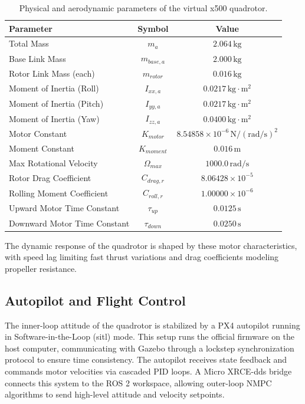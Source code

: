     \begin{table}[htbp]
        \centering
        \caption{Physical and aerodynamic parameters of the virtual x500 quadrotor.}
        \label{tab:uav_parameters}
        \begin{tabular}{lcc}
            \toprule
            \textbf{Parameter} & \textbf{Symbol} & \textbf{Value} \\
            \midrule
            Total Mass & $m_a$ & $2.064\,\text{kg}$ \\
            Base Link Mass & $m_{base,a}$ & $2.000\,\text{kg}$ \\
            Rotor Link Mass (each) & $m_{rotor}$ & $0.016\,\text{kg}$ \\
            Moment of Inertia (Roll) & $I_{xx,a}$ & $0.0217\,\text{kg}\cdot\text{m}^2$ \\
            Moment of Inertia (Pitch) & $I_{yy,a}$ & $0.0217\,\text{kg}\cdot\text{m}^2$ \\
            Moment of Inertia (Yaw) & $I_{zz,a}$ & $0.0400\,\text{kg}\cdot\text{m}^2$ \\
            Motor Constant & $K_{motor}$ & $8.54858 \times 10^{-6}\,\text{N}/(\text{rad/s})^2$ \\
            Moment Constant & $K_{moment}$ & $0.016\,\text{m}$ \\
            Max Rotational Velocity & $\Omega_{max}$ & $1000.0\,\text{rad/s}$ \\
            Rotor Drag Coefficient & $C_{drag,r}$ & $8.06428 \times 10^{-5}$ \\
            Rolling Moment Coefficient & $C_{roll,r}$ & $1.00000 \times 10^{-6}$ \\
            Upward Motor Time Constant & $\tau_{up}$ & $0.0125\,\text{s}$ \\
            Downward Motor Time Constant & $\tau_{down}$ & $0.0250\,\text{s}$ \\
            \bottomrule
        \end{tabular}
    \end{table}

    The dynamic response of the quadrotor is shaped by these motor characteristics, with speed lag limiting fast thrust variations and drag coefficients modeling propeller resistance.

    \subsection{Autopilot and Flight Control}
    The inner-loop attitude of the quadrotor is stabilized by a PX4 autopilot running in Software-in-the-Loop (\gls{sitl}) mode. This setup runs the official firmware on the host computer, communicating with Gazebo through a lockstep synchronization protocol to ensure time consistency. The autopilot receives state feedback and commands motor velocities via cascaded PID loops. A Micro XRCE-\gls{dds} bridge connects this system to the ROS 2 workspace, allowing outer-loop NMPC algorithms to send high-level attitude and velocity setpoints.

